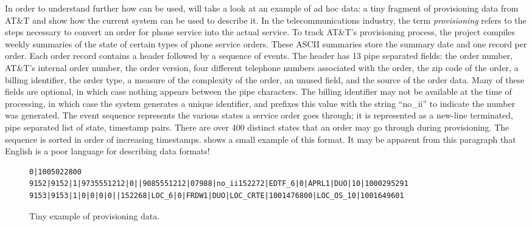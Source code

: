 \documentclass[11pt]{article}
\begin{document}
In order to understand further how \pads{} can be used,
will take a look at an example of ad hoc data:
a tiny fragment of provisioning data from AT\&T and show
how the current \pads{} system can be used to describe it.
In the telecommunications industry, the term \textit{provisioning} refers to the steps necessary to convert an order for phone service into the actual 
service.  
To track AT\&T's provisioning process, the \dibbler{} project compiles
weekly summaries of the state of certain types of phone service orders.  
These ASCII summaries store the summary date and one record per order.
Each order record contains a header followed by a sequence of events.
The header has 13 pipe separated fields: the order number, AT\&T's
internal order number, the order version, four different telephone
numbers associated with the order, the zip code of the order, a
billing identifier, the order type, a measure of the complexity of the
order, an unused field, and the source of the order data.  Many of
these fields are optional, in which case nothing appears between the
pipe characters.  The billing identifier may not be available at the
time of processing, in which case the system generates a unique
identifier, and prefixes this value with the string ``no\_ii'' to
indicate the number was generated. The event sequence represents the
various states a service order goes through; it is represented as a
new-line terminated, pipe separated list of state, timestamp pairs.
There are over 400 distinct states that an order may go through during
provisioning.  The sequence is sorted in order of increasing timestamps.  shows a small example of
this format.
It may be apparent from this paragraph that English is a poor
language for describing data formats!


\begin{figure*}
\begin{small}
\begin{verbatim}
0|1005022800
9152|9152|1|9735551212|0||9085551212|07988|no_ii152272|EDTF_6|0|APRL1|DUO|10|1000295291
9153|9153|1|0|0|0|0||152268|LOC_6|0|FRDW1|DUO|LOC_CRTE|1001476800|LOC_OS_10|1001649601
\end{verbatim}
\caption{Tiny example of \dibbler{} provisioning data.}
\label{figure:dibbler-records}
\end{small}
\end{figure*}
\end{document}
